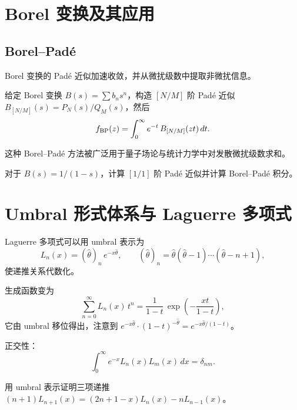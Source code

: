 \section{Borel 变换及其应用}

\subsection{Borel--Pad\'e}

Borel 变换的 Pad\'e 近似加速收敛，并从微扰级数中提取非微扰信息。

给定 Borel 变换 $B(s)=\sum b_n s^n$，构造 $[N/M]$ 阶 Pad\'e 近似 $B_{[N/M]}(s)=P_N(s)/Q_M(s)$，然后
\begin{equation}
f_{\rm BP}(z) = \int_0^\infty e^{-t}\,B_{[N/M]}(zt)\,dt.
\label{eq:9.3.1}
\end{equation}

这种 Borel--Pad\'e 方法被广泛用于量子场论与统计力学中对发散微扰级数求和。

\begin{exercise}
对于 $B(s)=1/(1-s)$，计算 $[1/1]$ 阶 Pad\'e 近似并计算 Borel--Pad\'e 积分。
\end{exercise}

\section{Umbral 形式体系与 Laguerre 多项式}

Laguerre 多项式可以用 umbral 表示为
\begin{equation}
L_n(x) = (\hat\theta)_n\,e^{-x\hat\theta},
\qquad (\hat\theta)_n = \hat\theta(\hat\theta-1)\cdots(\hat\theta-n+1),
\label{eq:9.4.1}
\end{equation}
使递推关系代数化。

生成函数变为
\begin{equation}
\sum_{n=0}^\infty L_n(x)\,t^n
= \frac{1}{1-t}\,\exp\!\left(-\frac{xt}{1-t}\right),
\label{eq:9.4.2}
\end{equation}
它由 umbral 移位得出，注意到
$e^{-x\hat\theta}\cdot(1-t)^{-\hat\theta}=e^{-x\hat\theta/(1-t)}$。

正交性：
\begin{equation}
\int_0^\infty e^{-x}L_n(x)L_m(x)\,dx = \delta_{nm}.
\label{eq:9.4.3}
\end{equation}

\begin{exercise}
用 umbral 表示证明三项递推
$(n+1)L_{n+1}(x)=(2n+1-x)L_n(x)-nL_{n-1}(x)$。
\end{exercise}

